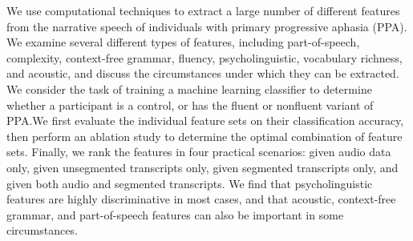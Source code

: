 We use computational techniques to extract a large number of different features from the narrative speech of individuals with primary progressive aphasia (PPA). We examine several different types of features, including part-of-speech, complexity, context-free grammar, fluency, psycholinguistic, vocabulary richness, and acoustic, and discuss the circumstances under which they can be extracted. We consider the task of training a machine learning classifier to determine whether a participant is a control, or has the fluent or nonfluent variant of PPA.We first evaluate the individual feature sets on their classification accuracy, then perform an ablation study to determine the optimal combination of feature sets. Finally, we rank the features in four practical scenarios: given audio data only, given unsegmented transcripts only, given segmented transcripts only, and given both audio and segmented transcripts. We find that psycholinguistic features are highly discriminative in most cases, and that acoustic, context-free grammar, and part-of-speech features can also be important in some circumstances.
